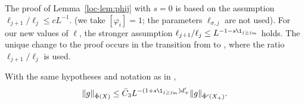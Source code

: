 The proof of Lemma~\ref{loc-lem:phij} with $s = 0$
is based on the assumption  $\ell_{j+1}/\ell_j \leq  cL^{-1}$.
(we take $[\varphi_i]=1$; the parameters $\ell_{\sigma,j}$ are not used).
For our new values of $\ell$, the stronger assumption
$\ell_{j+1}/\ell_j \leq L^{-1 - s \1_{j \geq j_m}}$ holds.
The unique change to the proof occurs in the transition from
\cite[\eqref{loc-e:gTay1}]{BS-rg-loc} to
\cite[\eqref{loc-e:rhognew}]{BS-rg-loc}, where the ratio
$\ell_{j+1}/\ell_j$ is used.


\begin{lemma}
\label{lem:phiij-improved}
With the same hypotheses and notation as in \cite[Lemma~\ref{loc-lem:phij}]{BS-rg-loc},
\begin{equation}
\lbeq{gbd-improved}
\|g\|_{\tilde{\Phi} (X)}
\leq
\bar C_3
L^{- (1 + s \1_{j \geq j_m}) d_+'}  \|g\|_{\tilde{\Phi}' (X_+)}.
\end{equation}
\end{lemma}


